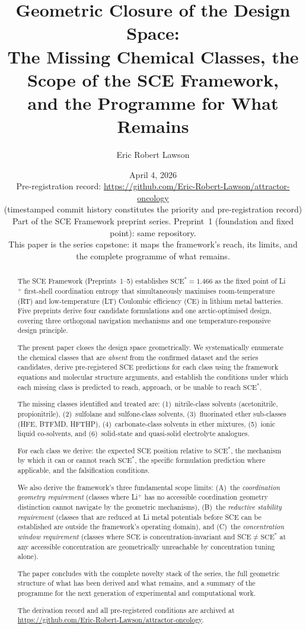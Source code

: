 \documentclass[11pt]{article}
\title{\textbf{Geometric Closure of the Design Space:\\
The Missing Chemical Classes, the Scope of the SCE Framework,\\
and the Programme for What Remains}}
\author[1]{Eric Robert Lawson}
\affil[1]{Independent Researcher, OrganismCore Initiative\\
\texttt{ORCID: 0009-0002-0414-6544}\\
Repository: \url{https://github.com/Eric-Robert-Lawson/attractor-oncology}}
\date{April 4, 2026\\
\small Pre-registration record:
\url{https://github.com/Eric-Robert-Lawson/attractor-oncology}\\
\small (timestamped commit history constitutes the priority
and pre-registration record)\\
\small Part of the SCE Framework preprint series.
Preprint~1 (foundation and fixed point):
same repository.\\
\small This paper is the series capstone: it maps the framework's
reach, its limits, and the complete programme of what remains.}
\theoremstyle{plain}
\theoremstyle{definition}
\theoremstyle{remark}
\begin{document}
\maketitle

\begin{abstract}
The SCE Framework (Preprints~1--5) establishes $\mathrm{SCE}^{*}
= 1.466$ as the fixed point of Li$^+$ first-shell coordination
entropy that simultaneously maximises room-temperature (RT) and
low-temperature (LT) Coulombic efficiency (CE) in lithium metal
batteries.  Five preprints derive four candidate formulations and
one arctic-optimised design, covering three orthogonal navigation
mechanisms and one temperature-responsive design principle.

The present paper closes the design space geometrically.  We
systematically enumerate the chemical classes that are \emph{absent}
from the confirmed dataset and the series candidates, derive
pre-registered SCE predictions for each class using the framework
equations and molecular structure arguments, and establish the
conditions under which each missing class is predicted to reach,
approach, or be unable to reach $\mathrm{SCE}^{*}$.

The missing classes identified and treated are:
(1)~nitrile-class solvents (acetonitrile, propionitrile),
(2)~sulfolane and sulfone-class solvents,
(3)~fluorinated ether sub-classes (HFE, BTFMD, HFTHP),
(4)~carbonate-class solvents in ether mixtures,
(5)~ionic liquid co-solvents,
and (6)~solid-state and quasi-solid electrolyte analogues.

For each class we derive: the expected SCE position relative to
$\mathrm{SCE}^{*}$, the mechanism by which it can or cannot
reach $\mathrm{SCE}^{*}$, the specific formulation prediction
where applicable, and the falsification conditions.

We also derive the framework's three fundamental scope limits:
(A)~the \emph{coordination geometry requirement} (classes where
Li$^+$ has no accessible coordination geometry distinction cannot
navigate by the geometric mechanisms), (B)~the \emph{reductive
stability requirement} (classes that are reduced at Li metal
potentials before SCE can be established are outside the framework's
operating domain), and (C)~the \emph{concentration window
requirement} (classes where SCE is concentration-invariant and
SCE$\neq\mathrm{SCE}^{*}$ at any accessible concentration are
geometrically unreachable by concentration tuning alone).

The paper concludes with the complete novelty stack of the series,
the full geometric structure of what has been derived and what
remains, and a summary of the programme for the next generation of
experimental and computational work.

The derivation record and all pre-registered conditions are archived
at \url{https://github.com/Eric-Robert-Lawson/attractor-oncology}.
\end{abstract}
\end{document}
